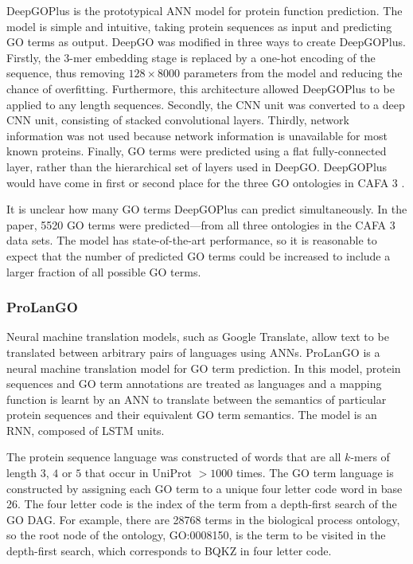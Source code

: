 DeepGOPlus \cite{Kulmanov2020} is the prototypical ANN model for protein function prediction. The model is simple and intuitive, taking protein sequences as input and predicting GO terms as output. DeepGO was modified in three ways to create DeepGOPlus. Firstly, the $3$-mer embedding stage is replaced by a one-hot encoding of the sequence, thus removing $128\times 8000$ parameters from the model and reducing the chance of overfitting. Furthermore, this architecture allowed DeepGOPlus to be applied to any length sequences. Secondly, the CNN unit was converted to a deep CNN unit, consisting of stacked convolutional layers. Thirdly, network information was not used because network information is unavailable for most known proteins. Finally, GO terms were predicted using a flat fully-connected layer, rather than the hierarchical set of layers used in DeepGO. DeepGOPlus would have come in first or second place for the three GO ontologies in CAFA 3 \cite{Zhou2019}.

It is unclear how many GO terms DeepGOPlus can predict simultaneously. In the paper, \num{5520} GO terms were predicted---from all three ontologies in the CAFA 3 data sets. The model has state-of-the-art performance, so it is reasonable to expect that the number of predicted GO terms could be increased to include a larger fraction of all possible GO terms.

\subsubsection{ProLanGO}

Neural machine translation models, such as Google Translate, allow text to be translated between arbitrary pairs of languages using ANNs. ProLanGO \cite{Cao2017} is a neural machine translation model for GO term prediction. In this model, protein sequences and GO term annotations are treated as languages and a mapping function is learnt by an ANN to translate between the semantics of particular protein sequences and their equivalent GO term semantics. The model is an RNN, composed of LSTM units.

The protein sequence language was constructed of words that are all $k$-mers of length $3$, $4$ or $5$ that occur in UniProt $> 1000$ times. The GO term language is constructed by assigning each GO term to a unique four letter code word in base 26. The four letter code is the index of the term from a depth-first search of the GO DAG. For example, there are \num{28768} terms in the biological process ontology, so the root node of the ontology, GO:0008150, is the  term to be visited in the depth-first search, which corresponds to BQKZ in four letter code.

